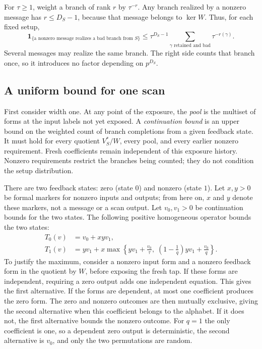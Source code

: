 For $\tau\ge1$, weight a branch of rank $r$ by $\tau^{-r}$.
Any branch realized by a nonzero message has $r\le D_S-1$, because
that message belongs to $\ker W$. Thus, for each fixed setup,
\begin{equation}\label{eq:rank-event-domination}
 \mathbf1_{\{\text{a nonzero message realizes a bad branch from }S\}}
 \le \tau^{D_S-1}\sum_{\gamma\text{ retained and bad}}
                                  \tau^{-r(\gamma)}.
\end{equation}
Several messages may realize the same branch. The right side counts
that branch once, so it introduces no factor depending on $p^{D_S}$.

\subsection{A uniform bound for one scan}

First consider width one. At any point of the exposure, the
\emph{pool} is the multiset of forms at the input labels not yet exposed.
A \emph{continuation bound} is an upper bound on the weighted count of
branch completions from a given feedback state. It must hold for every
quotient $V_S^*/W$, every pool, and every earlier nonzero requirement.
Fresh coefficients remain independent of this exposure history.
Nonzero requirements restrict the branches being counted; they do not
condition the setup distribution.

There are two feedback states: zero (state $0$) and nonzero (state $1$).
Let $x,y>0$ be formal markers for nonzero inputs and outputs; from here
on, $x$ and $y$ denote these markers, not a message or a scan output.
Let $v_0,v_1>0$ be continuation bounds for the two states.
The following positive homogeneous operator bounds the two states:
\begin{align}
 T_0(v)&=v_0+xyv_1,\nonumber\\
 T_1(v)&=yv_1+x\max\left\{
        yv_1+\frac{v_0}{\tau},\;
        \left(1-\frac1q\right)yv_1+\frac{v_0}{q}
                         \right\}.\label{eq:width-one-quotient}
\end{align}
To justify the maximum, consider a nonzero input form and a nonzero
feedback form in the quotient by $W$, before exposing the fresh tap.
If these forms are independent, requiring a zero output adds one
independent equation. This gives the first alternative. If the forms
are dependent, at most one coefficient produces the zero form.
The zero and nonzero outcomes are then mutually exclusive, giving the
second alternative when this coefficient belongs to the alphabet.
If it does not, the first alternative bounds the nonzero outcome.
For $q=1$ the only coefficient is one, so a dependent zero output is
deterministic, the second alternative is $v_0$, and only the two
permutations are random.


